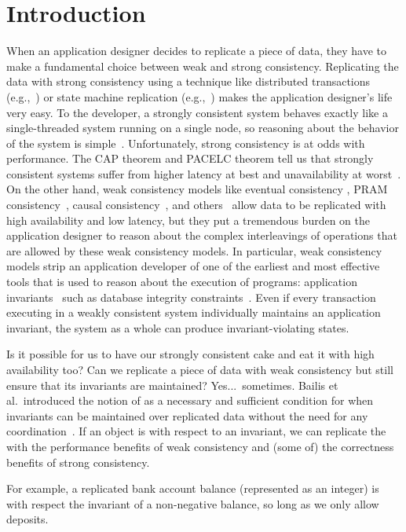 \section{Introduction}
When an application designer decides to replicate a piece of data, they have to
make a fundamental choice between weak and strong consistency. Replicating the
data with strong consistency using a technique like distributed transactions
(e.g.,~\cite{bernstein1981concurrency,mohan1986transaction}) or state machine
replication (e.g.,~\cite{schneider1990implementing, lamport1998part,
liskov2012viewstamped, ongaro2014search}) makes the application designer's life
very easy. To the developer, a strongly consistent system behaves exactly like
a single-threaded system running on a single node, so reasoning about the
behavior of the system is simple~\cite{herlihy1990linearizability}.
Unfortunately, strong consistency is at odds with performance. The CAP theorem
and PACELC theorem tell us that strongly consistent systems suffer from higher
latency at best and unavailability at worst~\cite{gilbert2002brewer,
brewer2012cap, abadi2012consistency}. On the other hand, weak consistency
models like eventual consistency \cite{vogels2009eventually}, PRAM
consistency~\cite{lipton1988pram}, causal consistency~\cite{ahamad1995causal},
and others~\cite{lloyd2011don, mehdi2017can} allow data to be replicated with
high availability and low latency, but they put a tremendous burden on the
application designer to reason about the complex interleavings of operations
that are allowed by these weak consistency models. In particular, weak
consistency models strip an application developer of one of the earliest and
most effective tools that is used to reason about the execution of programs:
application invariants~\cite{hoare1969axiomatic, balegas2015towards} such as
database integrity constraints~\cite{grefen1993integrity, gupta1993local}. Even
if every transaction executing in a weakly consistent system individually
maintains an application invariant, the system as a whole can produce
invariant-violating states.

Is it possible for us to have our strongly consistent cake and eat it with high
availability too? Can we replicate a piece of data with weak consistency but
still ensure that its invariants are maintained? Yes...\ sometimes. Bailis et
al.\ introduced the notion of \emph{\invariantconfluence{}} as a necessary and
sufficient condition for when invariants can be maintained over replicated data
without the need for any coordination~\cite{bailis2014coordination}. If an
object is \invariantconfluent{} with respect to an 
invariant, we can replicate the  with the
performance benefits of weak consistency and (some of) the correctness benefits
of strong consistency.
\begin{revisions}
  For example, a replicated bank account balance (represented as an integer) is
  \invariantconfluent{} with respect the invariant of a non-negative balance,
  so long as we only allow deposits.
\end{revisions}

